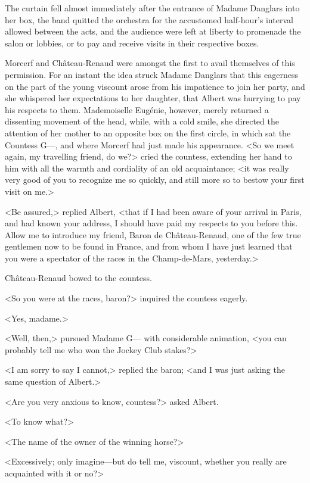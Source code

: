 The curtain fell almost immediately after the entrance of Madame Danglars into her box, the band quitted the orchestra for the accustomed half-hour's interval allowed between the acts, and the audience were left at liberty to promenade the salon or lobbies, or to pay and receive visits in their respective boxes. 

 Morcerf and Château-Renaud were amongst the first to avail themselves of this permission. For an instant the idea struck Madame Danglars that this eagerness on the part of the young viscount arose from his impatience to join her party, and she whispered her expectations to her daughter, that Albert was hurrying to pay his respects to them. Mademoiselle Eugénie, however, merely returned a dissenting movement of the head, while, with a cold smile, she directed the attention of her mother to an opposite box on the first circle, in which sat the Countess G—, and where Morcerf had just made his appearance.  <So we meet again, my travelling friend, do we?> cried the countess, extending her hand to him with all the warmth and cordiality of an old acquaintance; <it was really very good of you to recognize me so quickly, and still more so to bestow your first visit on me.> 

 <Be assured,> replied Albert, <that if I had been aware of your arrival in Paris, and had known your address, I should have paid my respects to you before this. Allow me to introduce my friend, Baron de Château-Renaud, one of the few true gentlemen now to be found in France, and from whom I have just learned that you were a spectator of the races in the Champ-de-Mars, yesterday.> 

 Château-Renaud bowed to the countess. 

 <So you were at the races, baron?> inquired the countess eagerly. 

 <Yes, madame.> 

 <Well, then,> pursued Madame G— with considerable animation, <you can probably tell me who won the Jockey Club stakes?> 

 <I am sorry to say I cannot,> replied the baron; <and I was just asking the same question of Albert.> 

 <Are you very anxious to know, countess?> asked Albert. 

 <To know what?> 

 <The name of the owner of the winning horse?> 

 <Excessively; only imagine—but do tell me, viscount, whether you really are acquainted with it or no?> 

